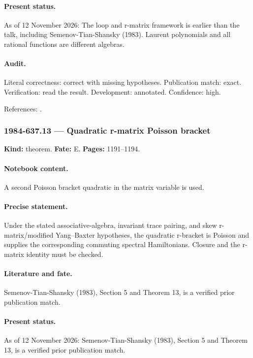 \paragraph{Present status.} As of 12 November 2026: The loop and r-matrix framework is earlier than the talk, including Semenov-Tian-Shansky (1983). Laurent polynomials and all rational functions are different algebras.

\paragraph{Audit.} Literal correctness: correct with missing hypotheses. Publication match: exact. Verification: read the result. Development: annotated. Confidence: high.

\noindent References: \citep{semenov1983classical}.\par

\subsubsection{1984-637.13 --- Quadratic r-matrix Poisson bracket}

\label{item:1984-637.13}

\noindent\textbf{Kind:} theorem. \textbf{Fate:} E. \textbf{Pages:} 1191--1194.\par

\paragraph{Notebook content.} A second Poisson bracket quadratic in the matrix variable is used.

\paragraph{Precise statement.} Under the stated associative-algebra, invariant trace pairing, and skew r-matrix/modified Yang--Baxter hypotheses, the quadratic r-bracket is Poisson and supplies the corresponding commuting spectral Hamiltonians. Closure and the r-matrix identity must be checked.

\paragraph{Literature and fate.} Semenov-Tian-Shansky (1983), Section 5 and Theorem 13, is a verified prior publication match.

\paragraph{Present status.} As of 12 November 2026: Semenov-Tian-Shansky (1983), Section 5 and Theorem 13, is a verified prior publication match.

